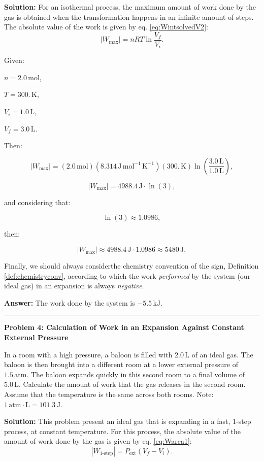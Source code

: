 \documentclass[
  9pt,
]{extbook}
\theoremstyle{definition}
\theoremstyle{definition}
\theoremstyle{definition}
\theoremstyle{definition}
\theoremstyle{remark}
\begin{document}
\textbf{Solution:} For an isothermal process, the maximum amount of work done by the gas is obtained when the transformation happens in an infinite amount of steps. The absolute value of the work is given by eq. \eqref{eq:WintsolvedV2}: \[\left| W_{\text{max}} \right| = nRT \ln \frac{V_f}{V_i}.\]

Given:

\(n=2.0\,\text{mol}\),

\(T=300.\,\text{K}\),

\(V_i=1.0\,\text{L}\),

\(V_f=3.0\,\text{L}\).

Then:

\[\left| W_{\text{max}} \right|=(2.0\,\text{mol})(8.314\,\text{J} \, \text{mol}^{-1} \, \text{K}^{-1})(300.\,\text{K})\ln\left(\frac{3.0\,\text{L}}{1.0\,\text{L}}\right),\]

\[\left| W_{\text{max}} \right|=4988.4\,\text{J}\cdot \ln(3),\]

and considering that:

\[\ln(3)\approx 1.0986,\]

then:

\[\left| W_{\text{max}} \right|\approx 4988.4\,\text{J} \cdot 1.0986 \approx 5480\,\text{J},\]

Finally, we should always considerthe chemistry convention of the sign, Definition \ref{def:chemistryconv}, according to which the work \emph{performed} by the system (our ideal gas) in an expansion is always \emph{negative}.

\textbf{Answer:} The work done by the system is \(-5.5\,\text{kJ}\).

\begin{center}\rule{0.5\linewidth}{0.5pt}\end{center}

\textbf{Problem 4: Calculation of Work in an Expansion Against Constant External Pressure}

In a room with a high pressure, a baloon is filled with \(2.0\,\text{L}\) of an ideal gas. The baloon is then brought into a different room at a lower external pressure of \(1.5\,\text{atm}\). The baloon expands quickly in this second room to a final volume of \(5.0\,\text{L}\). Calculate the amount of work that the gas releases in the second room. Assume that the temperature is the same across both rooms. Note: \(1 \,\text{atm}\cdotp\text{L} = 101.3\,\text{J}\).

\textbf{Solution:} This problem present an ideal gas that is expanding in a fast, 1-step process, at constant temperature. For this process, the absolute value of the amount of work done by the gas is given by eq. \eqref{eq:Warea1}: \[\left| W_{\text{1-step}} \right| = P_{\text{ext}} (V_f-V_i).\]
\end{document}
